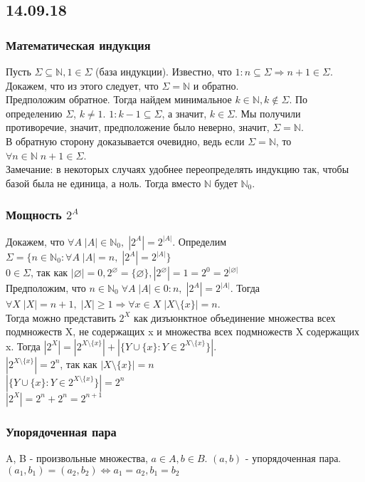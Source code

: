 \subsection{14.09.18}
\subsubsection{Математическая индукция}
Пусть $\Sigma \subseteq \mathbb{N}, 1 \in \Sigma$ (база индукции). Известно, что $1:n \subseteq \Sigma \Rightarrow n + 1 \in \Sigma$. Докажем, что из этого следует, что $\Sigma = \mathbb{N}$ и обратно.\\
Предположим обратное. Тогда найдем минимальное $k \in \mathbb{N}, k \not\in \Sigma$. По определению $\Sigma$, $k \not= 1$. $1:k - 1 \subseteq \Sigma$, а значит, $k \in \Sigma$. Мы получили противоречие, значит, предположение было неверно, значит, $\Sigma = \mathbb{N}$.\\
В обратную сторону доказывается очевидно, ведь если $\Sigma = \mathbb{N}$, то $\forall n \in \mathbb{N} \; n + 1 \in \Sigma$.\\
Замечание: в некоторых случаях удобнее переопределять индукцию так, чтобы базой была не единица, а ноль. Тогда вместо $\mathbb{N}$ будет $\mathbb{N}_0$.
\subsubsection{Мощность $2^A$}
Докажем, что $\forall A \; |A| \in \mathbb{N}_0 , \; |2^A| = 2^{|A|}$. Определим $\Sigma = \{n \in \mathbb{N}_0 : \forall A \; |A| = n , \; |2^A| = 2^{|A|}\}$\\
$0 \in \Sigma$, так как $|\varnothing| = 0, 2^{\varnothing} = \{\varnothing\}, |2^{\varnothing}| = 1 = 2^0 = 2^{|\varnothing|}$ \\
Предположим, что $n \in \mathbb{N}_0 \; \forall A \; |A| \in 0:n , \; |2^A| = 2^{|A|}$. Тогда $\forall X \;  |X| = n + 1 , \; |X| \geq 1 \Rightarrow \forall x \in X \; |X \setminus \{x\}| = n$. \\
Тогда можно представить $2^X$ как дизъюнктное объединение множества всех подмножеств X, не содержащих x и множества всех подмножеств X содержащих x. Тогда $|2^X| = |2^{X \setminus \{x\}}| + |{\{Y \cup \{x\} : Y \in 2^{X \setminus \{x\}}\}}|$. \\
$|2^{X \setminus \{x\}}| = 2^n$, так как $|X \setminus \{x\}| = n$ \\
$|\{Y \cup \{x\} : Y \in 2^{X \setminus \{x\}}\}| = 2^n$ \\
$|2^X| = 2^n + 2^n = 2^{n + 1}$
\subsubsection{Упорядоченная пара}
A, B - произвольные множества, $a \in A, b \in B$. $(a, b)$ - упорядоченная пара. $(a_1, b_1) = (a_2, b_2) \Leftrightarrow a_1 = a_2, b_1 = b_2$
